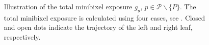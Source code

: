 \begin{figure}[htp]
\caption[Illustration of the total minibixel exposure $g_p$, $p \in \mathcal{P}\backslash\{P\}$]{
    Illustration of the total minibixel exposure $g_p$, $p \in \mathcal{P}\backslash\{P\}$.
    The total minibixel exposure is calculated using four cases, see .
    Closed and open dots indicate the trajectory of the left and right leaf, respectively.
    }
\label{fig:minibixelExposure}
\end{figure}
